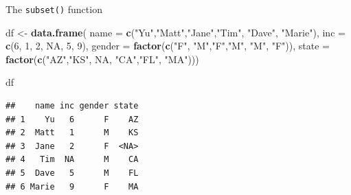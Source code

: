 \documentclass[ignorenonframetext,]{beamer}
\newenvironment{Shaded}{\begin{snugshade}}{\end{snugshade}}
\newcommand{\DataTypeTok}[1]{\textcolor[rgb]{0.13,0.29,0.53}{#1}}
\newcommand{\DecValTok}[1]{\textcolor[rgb]{0.00,0.00,0.81}{#1}}
\newcommand{\KeywordTok}[1]{\textcolor[rgb]{0.13,0.29,0.53}{\textbf{#1}}}
\newcommand{\NormalTok}[1]{#1}
\newcommand{\OtherTok}[1]{\textcolor[rgb]{0.56,0.35,0.01}{#1}}
\newcommand{\StringTok}[1]{\textcolor[rgb]{0.31,0.60,0.02}{#1}}
\begin{document}
\begin{frame}[fragile]{The \texttt{subset()} function}
\protect\hypertarget{the-subset-function-1}{}

\begin{Shaded}
\begin{Highlighting}[]
\NormalTok{df <-}\StringTok{  }\KeywordTok{data.frame}\NormalTok{(}
  \DataTypeTok{name =} \KeywordTok{c}\NormalTok{(}\StringTok{"Yu"}\NormalTok{,}\StringTok{"Matt"}\NormalTok{,}\StringTok{"Jane"}\NormalTok{,}\StringTok{"Tim"}\NormalTok{, }\StringTok{"Dave"}\NormalTok{, }\StringTok{"Marie"}\NormalTok{),}
  \DataTypeTok{inc =} \KeywordTok{c}\NormalTok{(}\DecValTok{6}\NormalTok{, }\DecValTok{1}\NormalTok{, }\DecValTok{2}\NormalTok{, }\OtherTok{NA}\NormalTok{, }\DecValTok{5}\NormalTok{, }\DecValTok{9}\NormalTok{),}
  \DataTypeTok{gender =} \KeywordTok{factor}\NormalTok{(}\KeywordTok{c}\NormalTok{(}\StringTok{"F"}\NormalTok{, }\StringTok{"M"}\NormalTok{,}\StringTok{"F"}\NormalTok{,}\StringTok{"M"}\NormalTok{, }\StringTok{"M"}\NormalTok{, }\StringTok{"F"}\NormalTok{)),}
  \DataTypeTok{state =} \KeywordTok{factor}\NormalTok{(}\KeywordTok{c}\NormalTok{(}\StringTok{"AZ"}\NormalTok{,}\StringTok{"KS"}\NormalTok{, }\OtherTok{NA}\NormalTok{, }\StringTok{"CA"}\NormalTok{,}\StringTok{"FL"}\NormalTok{, }\StringTok{"MA"}\NormalTok{)))}

\NormalTok{df}
\end{Highlighting}
\end{Shaded}

\begin{verbatim}
##    name inc gender state
## 1    Yu   6      F    AZ
## 2  Matt   1      M    KS
## 3  Jane   2      F  <NA>
## 4   Tim  NA      M    CA
## 5  Dave   5      M    FL
## 6 Marie   9      F    MA
\end{verbatim}

\end{frame}
\end{document}
